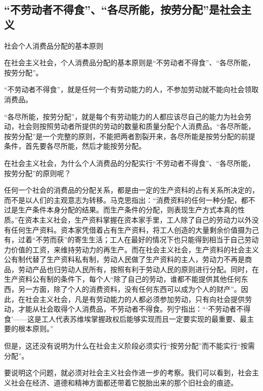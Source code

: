 \documentclass{book}
\begin{document}
\subsection{“不劳动者不得食”、“各尽所能，按劳分配”是社会主义}

社会个人消费品分配的基本原则

在社会主义社会，个人消费品分配的基本原则是“不劳动者不得食”、“各尽所能，按劳分配”。

“不劳动者不得食”，就是任何一个有劳动能力的人，不参加劳动就不能向社会领取消费品。

“各尽所能，按劳分配”，就是每个有劳动能力的人都应该尽自己的能力为社会劳动，社会则按照劳动者所提供的劳动的数量和质量分配个人消费品。“各尽所能，按劳分配”是一个完整的原则，不能把两者割裂开来，各尽所能是按劳分配的前提条件，首先要各尽所能，然后才能按劳分配。

在社会主义社会，为什么个人消费品的分配实行“不劳动者不得食”、“各尽所能，按劳分配”的原则呢？

任何一个社会的消费品的分配关系，都是由一定的生产资科的占有关系所决定的，而不是以人们的主观意志为转移。马克思指出：“消费资料的任何一种分配，都不过是生产条件本身分配的结果。而生产条件的分配，则表现生产方式本真的性质。”在资本主义社会，生产资料掌握在资本家手里，工人除了自己的劳动力以外没有任何生产资料。资本家凭借着占有生产资料，将工人创造的大量剩余价值摄为己有，过着“不劳而获”的寄生生活；工人在最好的情况下也只能得到相当于自己劳动力价值的工资，来维持劳动力的再生产。而在社会主义社会，生产资料的社会主义公有制代替了生产资料私有制，劳动人民做了生产资料的主人，劳动力不再是商品，劳动产品也归劳动人民所有，按照有利于劳动人民的原则进行分配。同时，在生产资料公有制的条件下，每个人“除了自己的劳动，谁都不能提供其他任何东西，另一方面，除了个人的消费资料，没有任何东西可以成为个人的财产”。因此，在社会主义社会，凡是有劳动能力的人都必须参加劳动，只有向社会提供劳动，才能从社会取得个人消费品，不劳动者不得食。列宁指出：“‘不劳动者不得食’——这是工人代表苏维埃掌握政权后能够实现而且一定要实现的最重要、最主要的根本原则。”

但是，这还没有说明为什么在社会主义阶段必须实行“按劳分配”而不能实行“按需分配”。

要说明这个问题，就必须对社会主义社会作进一步的考察。我们可以看到，社会主义社会在经济、道德和精神方面都还带着它脱胎出来的那个旧社会的痕迹。
\end{document}
